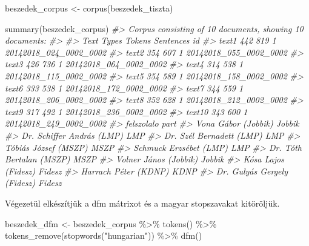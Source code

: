 \documentclass[
]{book}
\newenvironment{Shaded}{\begin{snugshade}}{\end{snugshade}}
\newcommand{\CommentTok}[1]{\textcolor[rgb]{0.56,0.35,0.01}{\textit{#1}}}
\newcommand{\FunctionTok}[1]{\textcolor[rgb]{0.00,0.00,0.00}{#1}}
\newcommand{\NormalTok}[1]{#1}
\newcommand{\OtherTok}[1]{\textcolor[rgb]{0.56,0.35,0.01}{#1}}
\newcommand{\SpecialCharTok}[1]{\textcolor[rgb]{0.00,0.00,0.00}{#1}}
\newcommand{\StringTok}[1]{\textcolor[rgb]{0.31,0.60,0.02}{#1}}
\begin{document}
\begin{Shaded}
\begin{Highlighting}[]
\NormalTok{beszedek\_corpus }\OtherTok{\textless{}{-}} \FunctionTok{corpus}\NormalTok{(beszedek\_tiszta)}

\FunctionTok{summary}\NormalTok{(beszedek\_corpus)}
\CommentTok{\#\textgreater{} Corpus consisting of 10 documents, showing 10 documents:}
\CommentTok{\#\textgreater{} }
\CommentTok{\#\textgreater{}    Text Types Tokens Sentences                     id}
\CommentTok{\#\textgreater{}   text1   442    819         1 20142018\_024\_0002\_0002}
\CommentTok{\#\textgreater{}   text2   354    607         1 20142018\_055\_0002\_0002}
\CommentTok{\#\textgreater{}   text3   426    736         1 20142018\_064\_0002\_0002}
\CommentTok{\#\textgreater{}   text4   314    538         1 20142018\_115\_0002\_0002}
\CommentTok{\#\textgreater{}   text5   354    589         1 20142018\_158\_0002\_0002}
\CommentTok{\#\textgreater{}   text6   333    538         1 20142018\_172\_0002\_0002}
\CommentTok{\#\textgreater{}   text7   344    559         1 20142018\_206\_0002\_0002}
\CommentTok{\#\textgreater{}   text8   352    628         1 20142018\_212\_0002\_0002}
\CommentTok{\#\textgreater{}   text9   317    492         1 20142018\_236\_0002\_0002}
\CommentTok{\#\textgreater{}  text10   343    600         1 20142018\_249\_0002\_0002}
\CommentTok{\#\textgreater{}                   felszolalo   part}
\CommentTok{\#\textgreater{}          Vona Gábor (Jobbik) Jobbik}
\CommentTok{\#\textgreater{}    Dr. Schiffer András (LMP)    LMP}
\CommentTok{\#\textgreater{}     Dr. Szél Bernadett (LMP)    LMP}
\CommentTok{\#\textgreater{}         Tóbiás József (MSZP)   MSZP}
\CommentTok{\#\textgreater{}       Schmuck Erzsébet (LMP)    LMP}
\CommentTok{\#\textgreater{}     Dr. Tóth Bertalan (MSZP)   MSZP}
\CommentTok{\#\textgreater{}        Volner János (Jobbik) Jobbik}
\CommentTok{\#\textgreater{}          Kósa Lajos (Fidesz) Fidesz}
\CommentTok{\#\textgreater{}         Harrach Péter (KDNP)   KDNP}
\CommentTok{\#\textgreater{}  Dr. Gulyás Gergely (Fidesz) Fidesz}
\end{Highlighting}
\end{Shaded}

Végezetül elkészítjük a dfm mátrixot és a magyar stopszavakat
kitöröljük.

\begin{Shaded}
\begin{Highlighting}[]
\NormalTok{beszedek\_dfm }\OtherTok{\textless{}{-}}\NormalTok{ beszedek\_corpus }\SpecialCharTok{\%\textgreater{}\%} 
  \FunctionTok{tokens}\NormalTok{() }\SpecialCharTok{\%\textgreater{}\%} 
  \FunctionTok{tokens\_remove}\NormalTok{(}\FunctionTok{stopwords}\NormalTok{(}\StringTok{"hungarian"}\NormalTok{)) }\SpecialCharTok{\%\textgreater{}\%} 
  \FunctionTok{dfm}\NormalTok{()}
\end{Highlighting}
\end{Shaded}
\end{document}
